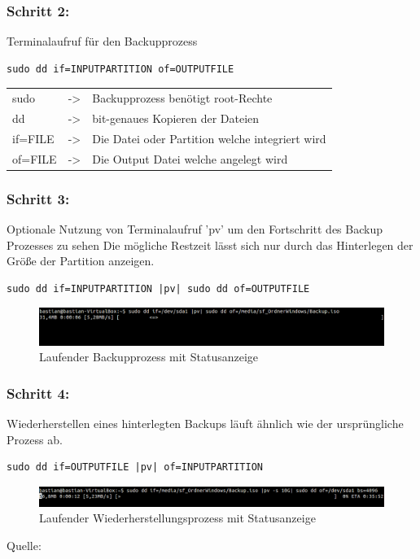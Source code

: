 \subsubsection*{Schritt 2:}
Terminalaufruf für den Backupprozess
\lstset{language=bash,numbers=none,frame=single}
\begin{lstlisting}
sudo dd if=INPUTPARTITION of=OUTPUTFILE
\end{lstlisting}
\begin{tabular}{l c l}
sudo	& -> & Backupprozess benötigt root-Rechte\\
dd	& -> & bit-genaues Kopieren der Dateien\\
if=FILE	& -> & Die Datei oder Partition welche integriert wird\\
of=FILE & -> & Die Output Datei welche angelegt wird\\
\end{tabular}

\subsubsection*{Schritt 3:}
Optionale Nutzung von Terminalaufruf 'pv' um den Fortschritt des Backup Prozesses zu sehen Die mögliche Restzeit lässt sich nur durch das Hinterlegen der Größe der Partition anzeigen.
\begin{lstlisting}
sudo dd if=INPUTPARTITION |pv| sudo dd of=OUTPUTFILE
\end{lstlisting}
\begin{figure}[ht]
\includegraphics[width=\textwidth]{pictures/Bastian/BILD2_pv}
\caption{Laufender Backupprozess mit Statusanzeige}
\end{figure}
\subsubsection*{Schritt 4:}
Wiederherstellen eines hinterlegten Backups läuft ähnlich wie der ursprüngliche Prozess ab.
\begin{lstlisting}
sudo dd if=OUTPUTFILE |pv| of=INPUTPARTITION
\end{lstlisting}
\begin{figure}[ht]
\includegraphics[width=\textwidth]{pictures/Bastian/BILD3_pv}
\caption{Laufender Wiederherstellungsprozess mit Statusanzeige}
\end{figure}
Quelle: \cite{dd}
\newpage %

